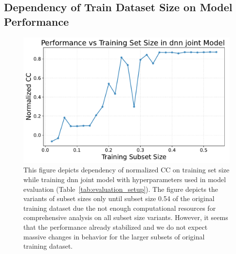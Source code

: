 \subsection{Dependency of Train Dataset Size on Model Performance}

\begin{figure}
    \centering
    \includegraphics[width=0.8\linewidth]{img/plots/train_size_performance_dependency.pdf}
    \caption{This figure depicts dependency of normalized CC on training set size while training dnn joint model with hyperparameters used in model evaluation (Table~\ref{tab:evaluation_setup}). The figure depicts the variants of subset sizes only until subset size 0.54 of the original training dataset due the not enough computational resources for comprehensive analysis on all subset size variants. However, it seems that the performance already stabilized and we do not expect massive changes in behavior for the larger subsets of original training dataset.}
    \label{fig:train_size_cc_norm_dependency}
\end{figure}
